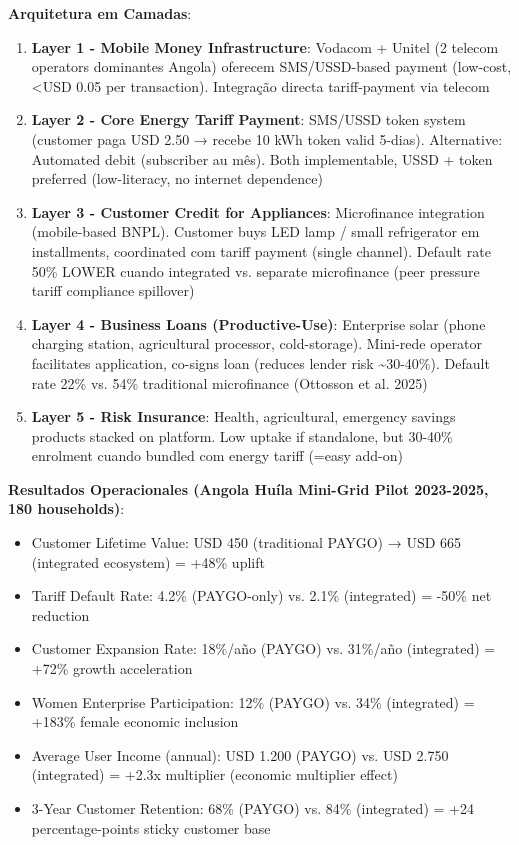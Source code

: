 \documentclass[12pt, a4paper]{article}
\begin{document}
\textbf{Arquitetura em Camadas}:
\begin{enumerate}
\item \textbf{Layer 1 - Mobile Money Infrastructure}: Vodacom + Unitel (2 telecom operators dominantes Angola) oferecem SMS/USSD-based payment (low-cost, <USD 0.05 per transaction). Integração directa tariff-payment via telecom
\item \textbf{Layer 2 - Core Energy Tariff Payment}: SMS/USSD token system (customer paga USD 2.50 → recebe 10 kWh token valid 5-dias). Alternative: Automated debit (subscriber au mês). Both implementable, USSD + token preferred (low-literacy, no internet dependence)
\item \textbf{Layer 3 - Customer Credit for Appliances}: Microfinance integration (mobile-based BNPL). Customer buys LED lamp / small refrigerator em installments, coordinated com tariff payment (single channel). Default rate 50\% LOWER cuando integrated vs. separate microfinance (peer pressure tariff compliance spillover)
\item \textbf{Layer 4 - Business Loans (Productive-Use)}: Enterprise solar (phone charging station, agricultural processor, cold-storage). Mini-rede operator facilitates application, co-signs loan (reduces lender risk \textasciitilde{}30-40\%). Default rate 22\% vs. 54\% traditional microfinance (Ottosson et al. 2025)
\item \textbf{Layer 5 - Risk Insurance}: Health, agricultural, emergency savings products stacked on platform. Low uptake if standalone, but 30-40\% enrolment cuando bundled com energy tariff (=easy add-on)
\end{enumerate}

\textbf{Resultados Operacionales (Angola Huíla Mini-Grid Pilot 2023-2025, 180 households)}:
\begin{itemize}
\item Customer Lifetime Value: USD 450 (traditional PAYGO) → USD 665 (integrated ecosystem) = +48\% uplift
\item Tariff Default Rate: 4.2\% (PAYGO-only) vs. 2.1\% (integrated) = -50\% net reduction
\item Customer Expansion Rate: 18\%/año (PAYGO) vs. 31\%/año (integrated) = +72\% growth acceleration
\item Women Enterprise Participation: 12\% (PAYGO) vs. 34\% (integrated) = +183\% female economic inclusion
\item Average User Income (annual): USD 1.200 (PAYGO) vs. USD 2.750 (integrated) = +2.3x multiplier (economic multiplier effect)
\item 3-Year Customer Retention: 68\% (PAYGO) vs. 84\% (integrated) = +24 percentage-points sticky customer base
\end{itemize}
\end{document}
